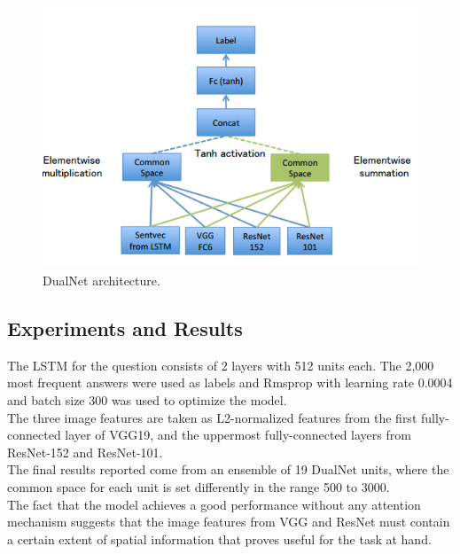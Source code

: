 \documentclass{article}
\begin{document}
    \begin{figure}[ht]
    	\centering
            \includegraphics[width=0.75\linewidth]{dualnetArch.PNG}
        \caption{DualNet architecture.}
    	\label{dualnetArch}
    \end{figure}

\subsection{Experiments and Results}
The LSTM for the question consists of 2 layers with 512 units each. The 2,000 most frequent answers were used as labels and Rmsprop with learning rate 0.0004 and batch size 300 was used to optimize the model.\\
The three image features are taken as L2-normalized features from the first fully-connected layer of VGG19, and the uppermost fully-connected layers from ResNet-152 and ResNet-101.\\
The final results reported come from an ensemble of 19 DualNet units, where the common space for each unit is set differently in the range 500 to 3000.\\
The fact that the model achieves a good performance without any attention mechanism suggests that the image features from VGG and ResNet must contain a certain extent of spatial information that proves useful for the task at hand.
\end{document}
